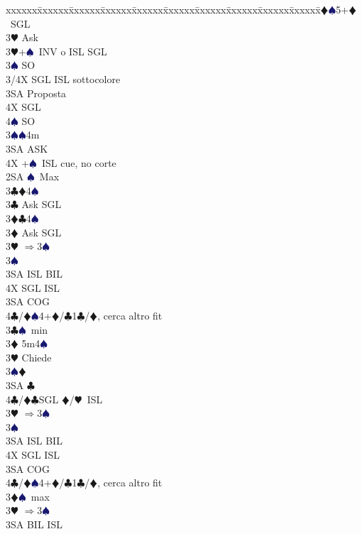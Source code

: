 \documentclass[a4paper,italian]{article}
\newcommand{\BC}{\textcolor{OliveGreen}{$\clubsuit$}}
\newcommand{\BD}{\textcolor{RedOrange}{$\vardiamondsuit$}}
\newcommand{\BH}{\textcolor{Red2}{$\varheartsuit${}}}
\newcommand{\BS}{\textcolor{MidnightBlue}{$\spadesuit${}}}
\newenvironment{bidtable}
{\begin{tabbing}

    xxxxxx\=xxxxxx\=xxxxxx\=xxxxxx\=xxxxxx\=xxxxxx\=xxxxxx\=xxxxxx\=xxxxxx\=xxxxxx\=\kill}
{\end{tabbing} }%
\begin{document}
\begin{multicols}{2}
\begin{bidtable}
        3\BD {}\BS 5+\BD\ SGL\+\\
        3\BH \> Ask\-\\
        3\BH {}+\BS\ INV o ISL SGL\+\\
        3\BS \> SO\+\\
        3/4X \> SGL ISL sottocolore\-\\
        3SA \> Proposta\+\\
        4X \> SGL\\
        4\BS \> SO\-\-\\
        3\BS {}\BS 4m\+\\
        3SA \> ASK\-\\
        4X +\BS\ ISL cue, no corte\-\\
        2SA \BS\ Max\+\\
        3\BC {}\BD 4\BS \+\\
        3\BC \> Ask SGL\-\\
        3\BD {}\BC 4\BS \+\\
        3\BD \> Ask SGL\-\\
        3\BH \> $\Rightarrow$3\BS\+\\
        3\BS\+\\
        3SA \> ISL BIL\\
        4X \> SGL ISL\-\-\\
        3SA \> COG\\
        4\BC/\BD {}\BS4+\BD/\BC1\BC/\BD, cerca altro fit \-\\
        3\BC {}\BS\ min\+\\
        3\BD \> 5m4\BS \+\\
        3\BH \> Chiede\+\\
        3\BS {}\BD \\
        3SA \BC \\
        4\BC/\BD {}\BC SGL \BD /\BH\ ISL \-\-\\
        3\BH \> $\Rightarrow$3\BS\+\\
        3\BS\+\\
        3SA \> ISL BIL\\
        4X \> SGL ISL\-\-\\
        3SA \> COG\\
        4\BC/\BD {}\BS4+\BD/\BC1\BC/\BD, cerca altro fit \-\\
        3\BD {}\BS\ max\+\\
        3\BH \> $\Rightarrow$3\BS\+\\
        3SA \> BIL ISL\\

\end{bidtable}
\end{multicols}
\end{document}
